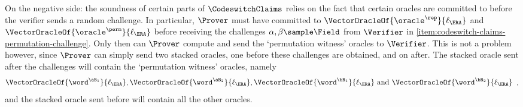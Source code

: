 \begin{itemize}
    On the negative side: the soundness of certain parts of $\CodeswitchClaims$ relies on the fact that certain oracles are committed to before the verifier sends a random challenge.
    In particular, $\Prover$ must have committed to $\VectorOracleOf{\oracle^{\rep}}{\ell_{\ERA}}$ and $\VectorOracleOf{\oracle^{\perm}}{\ell_{\ERA}}$ before receiving the challenges $\alpha, \beta \sample \Field$ from $\Verifier$ in \cref{item:codeswitch-claims-permutation-challenge}. Only then can $\Prover$ compute and send the `permutation witness' oracles to $\Verifier$.
    This is not a problem however, since $\Prover$ can simply send two stacked oracles, one before these challenges are obtained, and on after.
    The stacked oracle sent after the challenges will contain the `permutation witness' oracles, namely
    \[
        \VectorOracleOf{\word^{\aB_{1}}}{\ell_{\ERA}}, \VectorOracleOf{\word^{\aB_{2}}}{\ell_{\ERA}}, \VectorOracleOf{\word^{\bB_{1}}}{\ell_{\ERA}} \text{ and } \VectorOracleOf{\word^{\bB_{2}}}{\ell_{\ERA}} \enspace,
    \] 
    and the stacked oracle sent before will contain all the other oracles.
\end{itemize}




